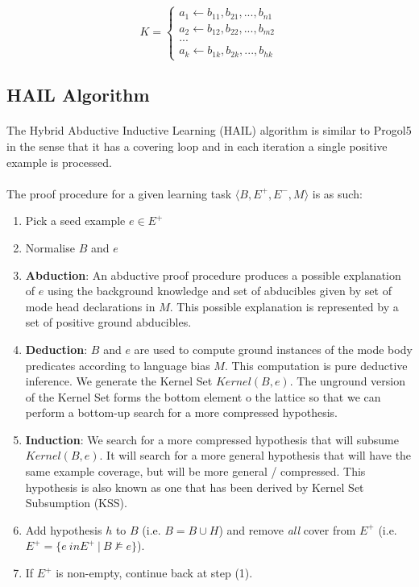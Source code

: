 \documentclass{article}
\theoremstyle{plain}
\theoremstyle{definition}
\begin{document}
\begin{multicols}{2}
\[ 
K = \begin{cases}
a_1 \leftarrow b_{11}, b_{21}, ..., b_{n1}\\
a_2 \leftarrow b_{12}, b_{22}, ..., b_{m2}\\
...\\
a_k \leftarrow b_{1k}, b_{2k}, ..., b_{hk}
\end{cases}
\]

\subsection{HAIL Algorithm}

\paragraph{} The Hybrid Abductive Inductive Learning (HAIL) algorithm is similar to Progol5 in the sense that it has a covering loop and in each iteration a single positive example is processed.

\paragraph{} The proof procedure for a given learning task $\langle B, E^+, E^-, M\rangle$ is as such:
\begin{enumerate}
\item Pick a seed example $e \in E^+$
\item Normalise $B$ and $e$
\item \textbf{Abduction}: An abductive proof procedure produces a possible explanation of $e$ using the background knowledge and set of abducibles given by set of mode head declarations in $M$. This possible explanation is represented by a set of positive ground abducibles. 
\item \textbf{Deduction}: $B$ and $e$ are used to compute ground instances of the mode body predicates according to language bias $M$. This computation is pure deductive inference. We generate the Kernel Set $Kernel(B, e)$. The unground version of the Kernel Set forms the bottom element o the lattice so that we can perform a bottom-up search for a more compressed hypothesis. 
\item \textbf{Induction}: We search for a more compressed hypothesis that will subsume $Kernel(B, e)$. It will search for a more general hypothesis that will have the same example coverage, but will be more general / compressed. This hypothesis is also known as one that has been derived by Kernel Set Subsumption (KSS).
\item Add hypothesis $h$ to $B$ (i.e. $B = B \cup H$) and remove \textit{all} cover from $E^+$ (i.e. $E^+ = \{e \ in E^+\ |\ B \not\models e\}$).
\item If $E^+$ is non-empty, continue back at step (1).
\end{enumerate}


\end{multicols}
\end{document}
